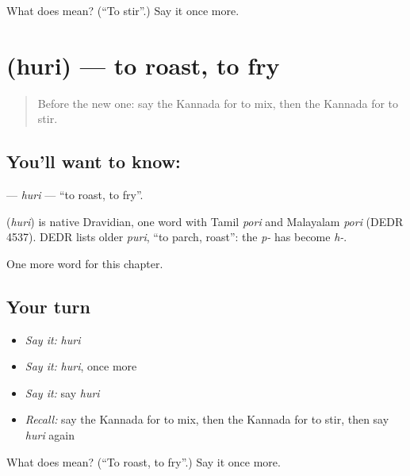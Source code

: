 \begin{tcolorbox}[breakable,colback=teal!4,colframe=teal!35!black,title={Before you move on}]
What does  mean? (\textquotedblleft{}To stir\textquotedblright{}.) Say it once more.
\end{tcolorbox}
\section[\texorpdfstring{\kn{ಹುರಿ} (huri)}{ಹುರಿ (huri)}]{ (huri) — to roast, to fry}

\label{lesson:KA-C272-huri}



\begin{quote}
Before the new one: say the Kannada for to mix, then the Kannada for to stir.
\end{quote}

\subsection*{You'll want to know: }
\textbf{} — \emph{huri} — \textquotedblleft{}to roast, to fry\textquotedblright{}.

\begin{cousinweb}
\textbf{} (\emph{huri}) is native Dravidian, one word with Tamil \emph{pori} and Malayalam \emph{pori} (DEDR 4537). DEDR lists older \emph{puri}, \textquotedblleft{}to parch, roast\textquotedblright{}: the \emph{p-} has become \emph{h-}.
\end{cousinweb}

\begin{grammarlens}[title={What you've built}]
One more word for this chapter.
\end{grammarlens}

\subsection*{Your turn}
\begin{itemize}
\raggedright
  \item \emph{Say it:} \emph{huri}
  \item \emph{Say it:} \emph{huri}, once more
  \item \emph{Say it:} say \emph{huri}
  \item \emph{Recall:} say the Kannada for to mix, then the Kannada for to stir, then say \emph{huri} again
\end{itemize}

\begin{tcolorbox}[breakable,colback=teal!4,colframe=teal!35!black,title={Before you move on}]
What does  mean? (\textquotedblleft{}To roast, to fry\textquotedblright{}.) Say it once more.
\end{tcolorbox}
